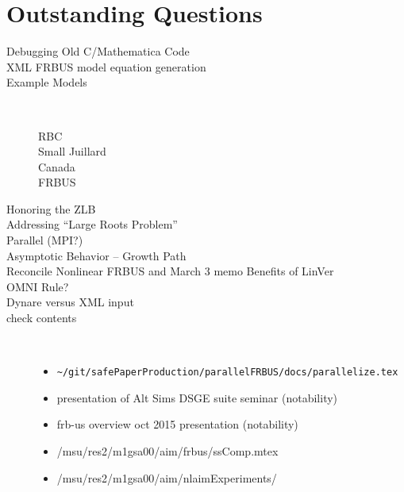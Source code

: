 \documentclass[12pt]{article}
\begin{document}
\section{Outstanding Questions}
\begin{description}
\item[Debugging Old C/Mathematica Code] 
\item[XML FRBUS model equation generation] 
\item[Example Models] \ 
  \begin{description}
  \item[RBC] 
  \item[Small Juillard] 
  \item[Canada] 
  \item[FRBUS] 
  \end{description}
\item[Honoring the ZLB] 
\item[Addressing ``Large Roots Problem''] 
\item[Parallel  (MPI?)] 
\item[Asymptotic Behavior -- Growth Path] 
\item[Reconcile Nonlinear FRBUS and March 3 memo Benefits of LinVer] 
\item[OMNI Rule?] 
\item[Dynare versus XML input] 
\item[check contents] \ 
  \begin{itemize}
  \item 
\begin{verbatim}
~/git/safePaperProduction/parallelFRBUS/docs/parallelize.tex
\end{verbatim}
  \item presentation of Alt Sims DSGE suite seminar (notability)
  \item frb-us overview oct 2015 presentation (notability)
  \item /msu/res2/m1gsa00/aim/frbus/ssComp.mtex
  \item /msu/res2/m1gsa00/aim/nlaimExperiments/
\end{itemize}
\end{description}
\end{document}
